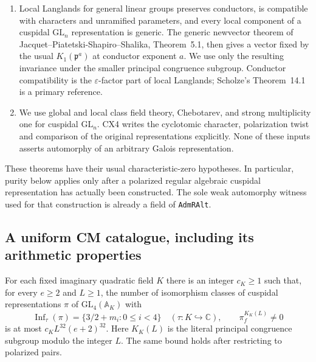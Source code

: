 \begin{enumerate}
Colmez--Fontaine, Proposition~4.2 and the corollary to
Theorem~4.3.  CX3 spells out the slope inequality needed here.
\item Local Langlands for general linear groups preserves
conductors, is compatible with characters and unramified
parameters, and every local component of a cuspidal
$\mathrm{GL}_n$ representation is generic.  The generic newvector
theorem of Jacquet--Piatetski-Shapiro--Shalika, Theorem~5.1,
then gives a vector fixed by the usual $K_1(\mathfrak p^a)$ at
conductor exponent $a$.  We use only the resulting invariance
under the smaller principal congruence subgroup.  Conductor
compatibility is the $\varepsilon$-factor part of local
Langlands; Scholze's Theorem~14.1 is a primary reference.
\item We use global and local class field theory, Chebotarev,
and strong multiplicity one for cuspidal $\mathrm{GL}_n$.
CX4 writes the cyclotomic character, polarization twist and
comparison of the original representations explicitly.  None of
these inputs asserts automorphy of an arbitrary Galois
representation.
\end{enumerate}

These theorems have their usual characteristic-zero hypotheses.
In particular, purity below applies only after a polarized
regular algebraic cuspidal representation has actually been
constructed.  The sole weak automorphy witness used for that
construction is already a field of \texttt{AdmRAlt}.

\subsection{A uniform CM catalogue, including its arithmetic properties}

\begin{proposition}
\label{claim:CX1}
For each fixed imaginary quadratic field $K$ there is an integer
$c_K\ge1$ such that, for every $e\ge2$ and $L\ge1$, the number
of isomorphism classes of cuspidal representations $\pi$ of
$\mathrm{GL}_4(\mathbb A_K)$ with
\[
 \operatorname{Inf}_\tau(\pi)=\{3/2+m_i:0\le i<4\}
 \quad(\tau:K\hookrightarrow\mathbb C),\qquad
 \pi_f^{K_K(L)}\ne0                                         \tag{CX.3}
\]
is at most $c_K L^{32}(e+2)^{32}$.  Here $K_K(L)$ is the
literal principal congruence subgroup modulo the integer $L$.
The same bound holds after restricting to polarized pairs.
\end{proposition}

